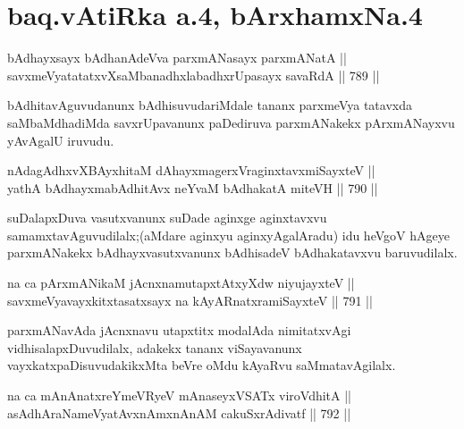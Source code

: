 \section*{baq.vAtiRka a.4, bArxhamxNa.4}


\begin{shl}
bAdhayxsayx bAdhanAdeVva parxmANasayx parxmANatA || \\
savxmeVyatatatxvXsaMbanadhxlabadhxrUpasayx savaRdA \hfill || 789 ||  
\end{shl}

\begin{artha}
bAdhitavAguvudanunx bAdhisuvudariMdale tananx parxmeVya tatavxda 
saMbaMdhadiMda savxrUpavanunx paDediruva parxmANakekx pArxmANayxvu yAvAgalU iruvudu.
\end{artha}


\begin{shl}
nAdagAdhxvX\s BAyxhitaM dAhayxmagerxVraginxtavxmiSayxteV || \\
yathA bAdhayxmabAdhitAvx neYvaM bAdhakatA miteVH \hfill || 790 ||  
\end{shl}

\begin{artha}
suDalapxDuva vasutxvanunx suDade aginxge aginxtavxvu samamxtavAguvudilalx;(aMdare aginxyu aginxyAgalAradu) idu heVgoV hAgeye parxmANakekx bAdhayxvasutxvanunx bAdhisadeV bAdhakatavxvu baruvudilalx.
\end{artha}


\begin{shl}
na ca pArxmANikaM jAcnxnamutapxtAtxyXdw niyujayxteV || \\
savxmeVyavayxkitxtasatxsayx na kAyARnatxramiSayxteV \hfill || 791 ||  
\end{shl}

\begin{artha}
parxmANavAda jAcnxnavu utapxtitx modalAda nimitatxvAgi vidhisalapxDuvudilalx, adakekx tananx viSayavanunx vayxkatxpaDisuvudakikxMta beVre oMdu kAyaRvu saMmatavAgilalx.
\end{artha}

\begin{shl}
na ca mAnAnatxreYmeVRyeV mAnaseyxVSATx viroVdhitA || \\
asAdhAraNameVyatAvxnAmxnAnAM cakuSxrAdivatf \hfill || 792 ||  
\end{shl}

